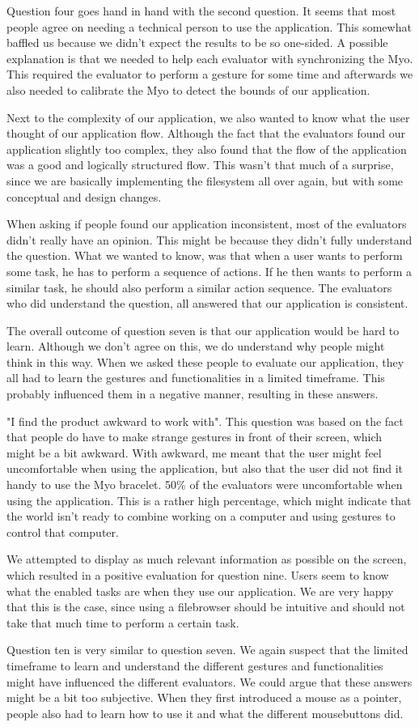 \documentclass{article}
\begin{document}
Question four goes hand in hand with the second question. It seems that most people agree on needing a technical person to use the application. This somewhat baffled us because we didn't expect the results to be so one-sided. A possible explanation is that we needed to help each evaluator with synchronizing the Myo. This required the evaluator to perform a gesture for some time and afterwards we also needed to calibrate the Myo to detect the bounds of our application.

Next to the complexity of our application, we also wanted to know what the user thought of our application flow. Although the fact that the evaluators found our application slightly too complex, they also found that the flow of the application was a good and logically structured flow. This wasn't that much of a surprise, since we are basically implementing the filesystem all over again, but with some conceptual and design changes.

When asking if people found our application inconsistent, most of the evaluators didn't really have an opinion. This might be because they didn't fully understand the question. What we wanted to know, was that when a user wants to perform some task, he has to perform a sequence of actions. If he then wants to perform a similar task, he should also perform a similar action sequence. The evaluators who did understand the question, all answered that our application is consistent.

The overall outcome of question seven is that our application would be hard to learn. Although we don't agree on this, we do understand why people might think in this way. When we asked these people to evaluate our application, they all had to learn the gestures and functionalities in a limited timeframe. This probably influenced them in a negative manner, resulting in these answers.

"I find the product awkward to work with". This question was based on the fact that people do have to make strange gestures in front of their screen, which might be a bit awkward. With awkward, me meant that the user might feel uncomfortable when using the application, but also that the user did not find it handy to use the Myo bracelet. 50\% of the evaluators were uncomfortable when using the application. This is a rather high percentage, which might indicate that the world isn't ready to combine working on a computer and using gestures to control that computer.

We attempted to display as much relevant information as possible on the screen, which resulted in a positive evaluation for question nine. Users seem to know what the enabled tasks are when they use our application. We are very happy that this is the case, since using a filebrowser should be intuitive and should not take that much time to perform a certain task.

Question ten is very similar to question seven. We again suspect that the limited timeframe to learn and understand the different gestures and functionalities might have influenced the different evaluators. We could argue that these answers might be a bit too subjective. When they first introduced a mouse as a pointer, people also had to learn how to use it and what the different mousebuttons did.
\end{document}
